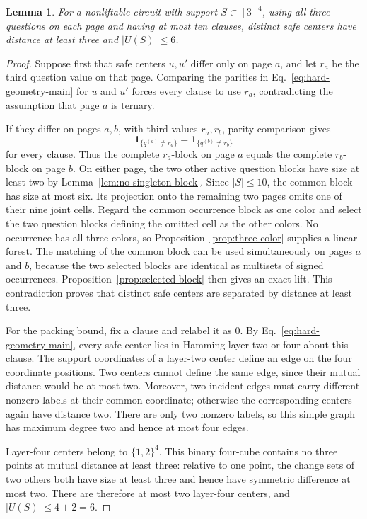 \documentclass[11pt]{article}
\newtheorem{lemma}[theorem]{Lemma}
\theoremstyle{definition}
\theoremstyle{remark}
\newcommand{\one}{\mathbf{1}}
\newcommand{\card}[1]{\lvert #1\rvert}
\numberwithin{equation}{section}
\begin{document}
\begin{lemma}\label{lem:separation-packing}
For a nonliftable circuit with support \(S\subset[3]^4\), using all three
questions on each page and having at most ten clauses,
distinct safe centers have distance at least three and
\(\card{U(S)}\leq6\).
\end{lemma}

\begin{proof}
Suppose first that safe centers \(u,u'\) differ only on page \(a\), and let
\(r_a\) be the third question value on that page.  Comparing the parities in
Eq.~\eqref{eq:hard-geometry-main} for \(u\) and \(u'\) forces every clause to
use \(r_a\), contradicting the assumption that page \(a\) is ternary.

If they differ on pages \(a,b\), with third values \(r_a,r_b\), parity
comparison gives
\[
  \one_{\{q^{(a)}\neq r_a\}}
  =
  \one_{\{q^{(b)}\neq r_b\}}
\]
for every clause.  Thus the complete \(r_a\)-block on page \(a\) equals the
complete \(r_b\)-block on page \(b\).  On either page, the two other active
question blocks have size at least two by
Lemma~\ref{lem:no-singleton-block}.  Since \(\card S\leq10\), the common block
has size at most six.  Its projection onto the remaining two pages omits one
of their nine joint cells.  Regard the common occurrence block as one color
and select the two question blocks defining the omitted cell as the other
colors.  No occurrence has all three colors, so
Proposition~\ref{prop:three-color} supplies a linear forest.  The matching of
the common block can be used simultaneously on pages \(a\) and \(b\), because
the two selected blocks are identical as multisets of signed occurrences.
Proposition~\ref{prop:selected-block} then gives an exact lift.  This
contradiction proves that distinct safe centers are separated by distance at
least three.

For the packing bound, fix a clause and relabel it as \(0\).  By
Eq.~\eqref{eq:hard-geometry-main}, every safe center lies in Hamming layer two
or four about this clause.  The support coordinates of a layer-two center
define an edge on the four coordinate positions.  Two centers cannot define
the same edge, since their mutual distance would be at most two.  Moreover,
two incident edges must carry different nonzero labels at their common
coordinate; otherwise the corresponding centers again have distance two.
There are only two nonzero labels, so this simple graph has maximum degree two
and hence at most four edges.

Layer-four centers belong to \(\{1,2\}^4\).  This binary four-cube contains no
three points at mutual distance at least three: relative to one point, the
change sets of two others both have size at least three and hence have
symmetric difference at most two.  There are therefore at most two
layer-four centers, and \(\card{U(S)}\leq4+2=6\).
\end{proof}
\end{document}
